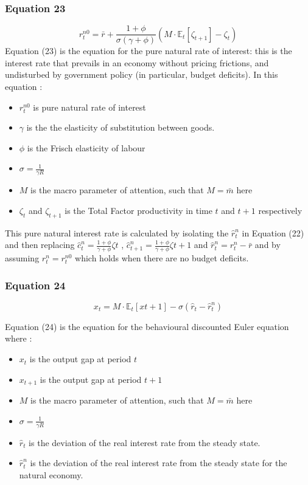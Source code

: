 \documentclass{article}
\begin{document}
\subsubsection*{Equation 23}
\begin{equation}\tag{23}
    r^{n0}_{t}=\bar{r}+\frac{1+\phi}{\sigma(\gamma+\phi)}\left(M\cdot\mathbb{E}_{t}\left[\zeta_{t+1}\right]-\zeta_{t}\right)
\end{equation}
Equation (23) is the equation for the pure natural rate of interest: this is the interest rate that prevails in an economy without pricing frictions, and undisturbed by government policy (in particular, budget deficits). In this equation : 
\begin{itemize}
    \item $r^{n0}_{t}$ is pure natural rate of interest
    \item $\gamma$ is the the elasticity of substitution between goods. 
    \item $\phi$ is the Frisch elasticity of labour
    \item $\sigma=\frac{1}{\gamma R}$ 
    \item $M$ is the macro parameter of attention, such that $M=\bar{m}$ here
    \item $\zeta_{t}$  and $\zeta_{t+1}$ is the Total Factor productivity in time $t$ and $t+1$ 
        respectively
\end{itemize}
    
This pure natural interest rate is calculated by isolating the $\hat r_{t}^{n}$ in Equation (22) and then replacing $\hat{c}_{t}^{n}=\frac{1+\phi}{\gamma+\phi}\zeta{t}$ , $\hat{c}_{t+1}^{n}=\frac{1+\phi}{\gamma+\phi}\zeta{t+1}$ and $\hat r_{t}^{n}=r_{t}^{n}-\bar{r}$ and by assuming $r_{t}^{n}=r^{n0}_{t}$ which holds when there are no budget deficits. 

\subsubsection*{Equation 24}
\begin{equation}\tag{24}
    x_{t}=M\cdot\mathbb{E}_{t}\left[x{t+1}\right]-\sigma(\hat{r}_{t}-\hat{r}^{n}_{t})
\end{equation}

Equation (24) is the equation for the behavioural discounted Euler equation where : 
\begin{itemize}
    \item $x_{t}$ is the output gap at period $t$
    \item $x_{t+1}$ is the output gap at period $t+1$
    \item $M$ is the macro parameter of attention, such that $M=\bar{m}$ here
    \item $\sigma=\frac{1}{\gamma R}$ 
    \item $\hat r_{t}$ is the deviation of the real interest rate from the steady state.
    \item $\hat r_{t}^{n}$ is the deviation of the real interest rate from the steady state for the natural economy.
\end{itemize}
\end{document}
